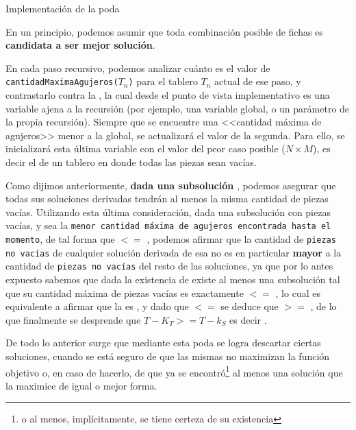 \documentclass[11pt, a4paper, twoside]{article}
\begin{document}
\begin{paragraph}{Implementación de la poda\\}

En un principio, podemos asumir que toda combinación posible de fichas es
\textbf{candidata a ser mejor solución}.

En cada paso recursivo, podemos analizar cuánto es el valor de
\texttt{cantidadMaximaAgujeros($T_n$)} para el tablero $T_n$ actual de ese
paso, y contrastarlo contra la , la cual desde el punto de vista implementativo
es una variable ajena a la recursión (por ejemplo, una variable global, o un
parámetro de la propia recursión). Siempre que se encuentre una <<cantidad
máxima de agujeros>> menor a la global, se actualizará el valor de la segunda.
Para ello, se inicializará esta última variable con el valor del peor caso
posible ($N \times M$), es decir el de un tablero en donde todas las piezas
sean vacías.

Como dijimos anteriormente, \textbf{dada una subsolución }, podemos
asegurar que todas sus soluciones derivadas tendrán al menos la misma cantidad
de piezas vacías. Utilizando esta última consideración, dada una subsolución
con  piezas vacías, y sea  la
\texttt{menor cantidad máxima de agujeros encontrada hasta el momento}, de tal
forma que  $<=$ , podemos afirmar que la
cantidad de \texttt{piezas no vacías} de cualquier solución derivada de esa
 no es en particular \textbf{mayor} a la cantidad
de \texttt{piezas no vacías} del resto de las soluciones, ya que por lo antes
expuesto sabemos que dada la existencia de  existe al
menos una subsolución  tal que su cantidad máxima de piezas
vacías es exactamente  $<=$ , lo
cual es equivalente a afirmar que la  es , y dado que  $<=$ 
se deduce que  $>=$ , de lo que
finalmente se desprende que $T - K_{T} >= T - k_{S}$ es decir .

De todo lo anterior surge que mediante esta poda se logra descartar ciertas
soluciones, cuando se está seguro de que las mismas no maximizan la función
objetivo o, en caso de hacerlo, de que ya se encontró\footnote{o al menos,
implícitamente, se tiene certeza de su existencia} al menos una solución que
la maximice de igual o mejor forma.

\end{paragraph}
\end{document}
